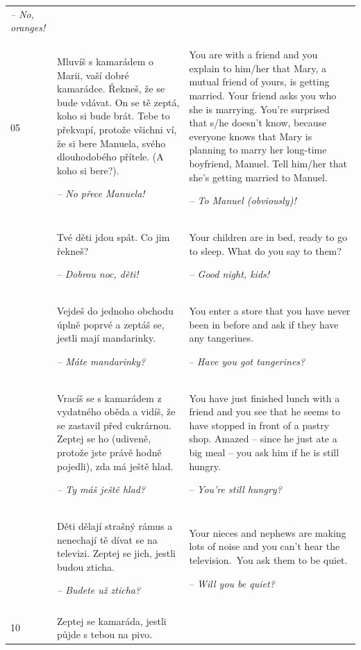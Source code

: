 \begin{xltabular}{\textwidth}{lQQ}
{\itshape -- No, oranges!}\\
05 & Mluvíš s kamarádem o Marii, vaší dobré kamarádce. Řekneš, že se bude vdávat. On se tě zeptá, koho si bude brát. Tebe to překvapí, protože všichni ví, že si bere Manuela, svého dlouhodobého přítele. (A koho si bere?).

{\itshape -- No přece Manuela!} & You are with a friend and you explain to him/her that Mary, a mutual friend of yours, is getting married. Your friend asks you who she is marrying. You're surprised that s/he doesn’t know, because everyone knows that Mary is planning to marry her long-time boyfriend, Manuel. Tell him/her that she’s getting married to Manuel.

{\itshape -- To Manuel (obviously)!}\\
 & Tvé děti jdou spát. Co jim řekneš?

-- \textit{Dobrou noc, děti!} & Your children are in bed, ready to go to sleep. What do you say to them?

{\itshape -- Good night, kids!}\\
 & Vejdeš do jednoho obchodu úplně poprvé a zeptáš se, jestli mají mandarinky.

{\itshape -- Máte mandarinky?} & You enter a store that you have never been in before and ask if they have any tangerines.

-- \textit{Have you got tangerines?}\\
 & Vracíš se s kamarádem z vydatného oběda a vidíš, že se zastavil před cukrárnou. Zeptej se ho (udiveně, protože jste právě hodně pojedli), zda má ještě hlad.

{\itshape -- Ty máš ještě hlad?} & You have just finished lunch with a friend and you see that he seems to have stopped in front of a pastry shop. Amazed -- since he just ate a big meal -- you ask him if he is still hungry.

-- \textit{You’re still hungry?}\\
 & Děti dělají strašný rámus a nenechají tě dívat se na televizi. Zeptej se jich, jestli budou zticha.

\textit{-- Budete už zticha?} & Your nieces and nephews are making lots of noise and you can’t hear the television.~You ask them to be quiet.

-- \textit{Will you be quiet?}\\
\\
10 & Zeptej se kamaráda, jestli půjde s tebou na pivo.


\end{xltabular}
